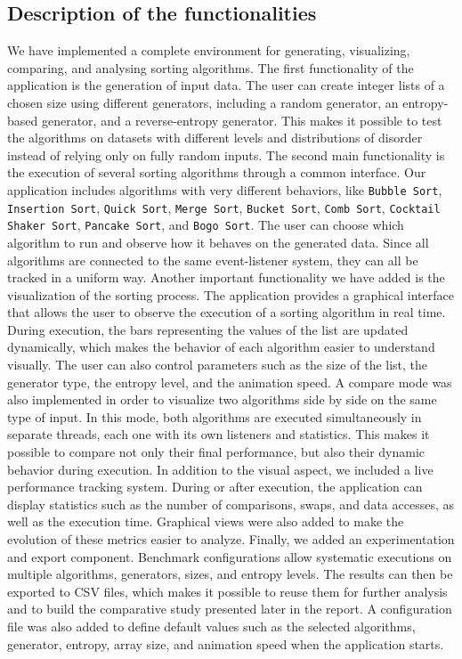 \documentclass{article}
\begin{document}
\subsection{Description of the functionalities}
We have implemented a complete environment for generating, visualizing, 
comparing, and analysing sorting algorithms. The first functionality of the 
application is the generation of input data. The user can create integer lists 
of a chosen size using different generators, including a random generator, an
entropy-based generator, and a reverse-entropy generator. This makes it 
possible to test the algorithms on datasets with different levels and 
distributions of disorder instead of relying only on fully random inputs.
The second main functionality is the execution of several sorting algorithms 
through a common interface. Our application includes algorithms with very 
different behaviors, like \texttt{Bubble Sort}, \texttt{Insertion Sort}, \texttt{Quick Sort}, \texttt{Merge Sort}, \texttt{Bucket Sort}, \texttt{Comb 
Sort}, \texttt{Cocktail Shaker Sort}, \texttt{Pancake Sort}, and \texttt{Bogo 
Sort}. The user can choose which algorithm to run and observe how it 
behaves on the generated data. Since all algorithms are connected to the 
same event-listener system, they can all be tracked in a uniform way.
Another important functionality we have added is the visualization of the 
sorting process. The application provides a graphical interface that allows 
the user to observe the execution of a sorting algorithm in real time. During 
execution, the bars representing the values of the list are updated 
dynamically, which makes the behavior of each algorithm easier to 
understand visually. The user can also control parameters such as the size of
the list, the generator type, the entropy level, and the animation speed.
A compare mode was also implemented in order to visualize two algorithms 
side by side on the same type of input. In this mode, both algorithms are 
executed simultaneously in separate threads, each one with its own listeners
and statistics. This makes it possible to compare not only their final 
performance, but also their dynamic behavior during execution.
In addition to the visual aspect, we included a live performance tracking 
system. During or after execution, the application can display statistics such 
as the number of comparisons, swaps, and data accesses, as well as the 
execution time. Graphical views were also added to make the evolution of 
these metrics easier to analyze.
Finally, we added an experimentation and export component. Benchmark 
configurations allow systematic executions on multiple algorithms, 
generators, sizes, and entropy levels. The results can then be exported to 
CSV files, which makes it possible to reuse them for further analysis and to 
build the comparative study presented later in the report. A configuration file
was also added to define default values such as the selected algorithms, 
generator, entropy, array size, and animation speed when the application 
starts.
\end{document}
